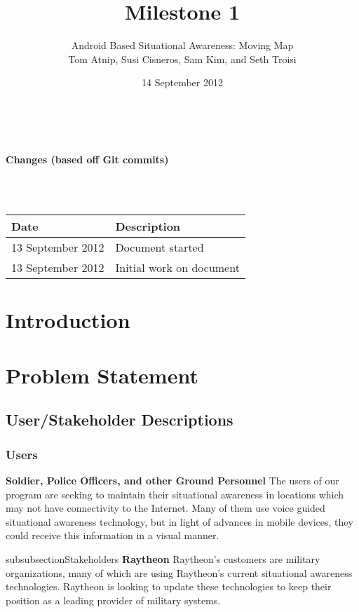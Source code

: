 \documentclass{article}
\begin{document}
\setlength{\voffset}{3.5in}
\title{Milestone 1}
\author{\Large Android Based Situational Awareness: Moving Map\\
Tom Atnip, Susi Cisneros, Sam Kim, and Seth Troisi}
\date{14 September 2012}
\maketitle
\clearpage
\setlength{\voffset}{0pt}
\tableofcontents
\clearpage
~\\
\begin{Large}\textbf{Changes (based off Git commits)}\end{Large}\\
~\\
\begin{tabular}{ | p{1.5in} | p{4.5in} | }
\hline
\textbf{Date} & \textbf{Description}\\
\hline
\hline
13 September 2012 & Document started\\
\hline
13 September 2012 & Initial work on document\\
\hline
\end{tabular}
\clearpage

\section{Introduction}

\section{Problem Statement}
\subsection{User/Stakeholder Descriptions}
\subsubsection{Users}
\textbf{Soldier, Police Officers, and other Ground Personnel}
The users of our program are seeking to maintain their situational awareness in locations which may not have connectivity to the Internet.  Many of them use voice guided situational awareness technology, but in light of advances in mobile devices, they could receive this information in a visual manner.  

subsubsection{Stakeholders}
\textbf{Raytheon}
Raytheon's customers are military organizations, many of which are using Raytheon's current situational awareness technologies.  Raytheon is looking to update these technologies to keep their position as a leading provider of military systems.
\end{document}
